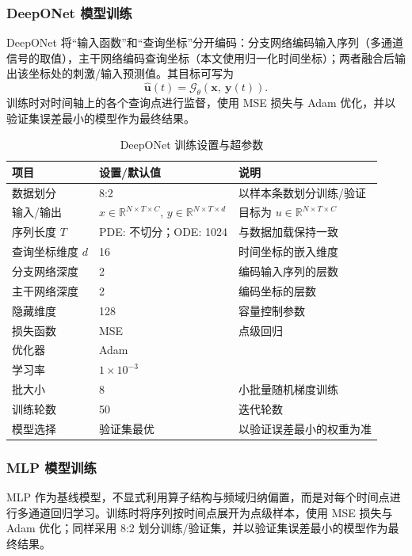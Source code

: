 \documentclass[12pt,a4paper]{article}
\begin{document}
\subsubsection{DeepONet 模型训练}

DeepONet 将“输入函数”和“查询坐标”分开编码：分支网络编码输入序列（多通道信号的取值），主干网络编码查询坐标（本文使用归一化时间坐标）；两者融合后输出该坐标处的刺激/输入预测值。其目标可写为
\[
\hat{\mathbf{u}}(t)=\mathcal{G}_{\theta}(\mathbf{x},\ \mathbf{y}(t)).
\]
训练时对时间轴上的各个查询点进行监督，使用 MSE 损失与 Adam 优化，并以验证集误差最小的模型作为最终结果。

\begin{table}[h]
\centering
\caption{DeepONet 训练设置与超参数}
\begin{tabular}{@{}lll@{}}
\toprule
项目 & 设置/默认值 & 说明 \\ \midrule
数据划分 & 8:2 & 以样本条数划分训练/验证 \\
输入/输出 & $x\in\mathbb{R}^{N\times T\times C}$, $y\in\mathbb{R}^{N\times T\times d}$ & 目标为 $u\in\mathbb{R}^{N\times T\times C}$ \\
序列长度 $T$ & PDE: 不切分；ODE: 1024 & 与数据加载保持一致 \\
查询坐标维度 $d$ & 16 & 时间坐标的嵌入维度 \\
分支网络深度 & 2 & 编码输入序列的层数 \\
主干网络深度 & 2 & 编码坐标的层数 \\
隐藏维度 & 128 & 容量控制参数 \\
损失函数 & MSE & 点级回归 \\
优化器 & Adam &  \\
学习率 & $1\times10^{-3}$ &  \\
批大小 & 8 & 小批量随机梯度训练 \\
训练轮数 & 50 & 迭代轮数 \\
模型选择 & 验证集最优 & 以验证误差最小的权重为准 \\
\bottomrule
\end{tabular}
\end{table}

\subsubsection{MLP 模型训练}

MLP 作为基线模型，不显式利用算子结构与频域归纳偏置，而是对每个时间点进行多通道回归学习。训练时将序列按时间点展开为点级样本，使用 MSE 损失与 Adam 优化；同样采用 8:2 划分训练/验证集，并以验证集误差最小的模型作为最终结果。
\end{document}
